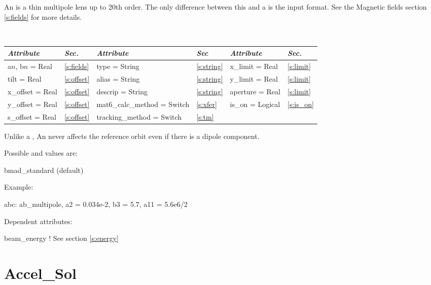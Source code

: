 An  is a thin multipole lens up to 20th order. The only
difference between this and a  is the input format. See the 
Magnetic fields section \ref{s:fields} for more details.

\begin{table}[h]
\centering 
{\tt
\begin{tabular}{|l|l||l|l||l|l|} \hline
  {\sl Attribute} & {\sl Sec.}  & {\sl Attribute} & {\sl Sec} & {\sl Attribute} & {\sl Sec.} \\ \hline
  a$n$, b$n$ = Real  &  \ref{s:fields} &  type = String                & \ref{s:string} & x\_limit = Real  & \ref{s:limit} \\ \hline
  tilt       = Real  &  \ref{s:offset} &  alias = String               & \ref{s:string} & y\_limit = Real  & \ref{s:limit} \\ \hline
  x\_offset  = Real  &  \ref{s:offset} &  descrip = String             & \ref{s:string} & aperture = Real  & \ref{s:limit} \\ \hline
  y\_offset  = Real  &  \ref{s:offset} &  mat6\_calc\_method = Switch  & \ref{s:xfer}   & is\_on = Logical & \ref{s:is_on} \\ \hline
  s\_offset  = Real  &  \ref{s:offset} &  tracking\_method = Switch    & \ref{s:tm}     &                  &               \\ \hline
\end{tabular}
}
\end{table}

Unlike a \mad {}, An  never affects the reference orbit
even if there is a dipole component.

\noindent
Possible  and  values are:
\vskip 0.05in
\begin{example}
   bmad\_standard  (default) 
\end{example}

\vskip0.2in \noindent
Example:
\begin{example}
  abc: ab_multipole, a2 = 0.034e-2, b3 = 5.7, a11 = 5.6e6/2
\end{example}

\vskip0.1in \noindent
Dependent attributes:
\begin{example}
  beam\_energy  ! See section \ref{s:energy}
\end{example}

\section{Accel\_Sol}
\label{s:accel_sol}

